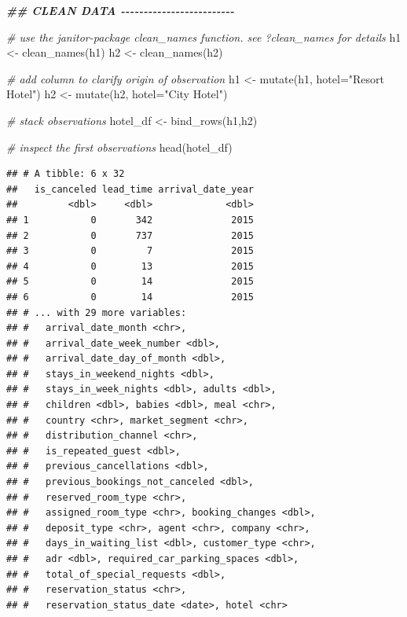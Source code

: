 \documentclass[
  12pt,
]{style/krantz}
\newenvironment{Shaded}{\begin{snugshade}}{\end{snugshade}}
\newcommand{\AttributeTok}[1]{\textcolor[rgb]{0.77,0.63,0.00}{#1}}
\newcommand{\CommentTok}[1]{\textcolor[rgb]{0.56,0.35,0.01}{\textit{#1}}}
\newcommand{\DocumentationTok}[1]{\textcolor[rgb]{0.56,0.35,0.01}{\textbf{\textit{#1}}}}
\newcommand{\FunctionTok}[1]{\textcolor[rgb]{0.00,0.00,0.00}{#1}}
\newcommand{\NormalTok}[1]{#1}
\newcommand{\OtherTok}[1]{\textcolor[rgb]{0.56,0.35,0.01}{#1}}
\newcommand{\StringTok}[1]{\textcolor[rgb]{0.31,0.60,0.02}{#1}}
\begin{document}
\begin{Shaded}
\begin{Highlighting}[]
\DocumentationTok{\#\# CLEAN DATA {-}{-}{-}{-}{-}{-}{-}{-}{-}{-}{-}{-}{-}{-}{-}{-}{-}{-}{-}{-}{-}{-}{-}{-}{-}}

\CommentTok{\# use the janitor{-}package clean\_names function. see ?clean\_names for details}
\NormalTok{h1 }\OtherTok{\textless{}{-}} \FunctionTok{clean\_names}\NormalTok{(h1)}
\NormalTok{h2 }\OtherTok{\textless{}{-}} \FunctionTok{clean\_names}\NormalTok{(h2)}

\CommentTok{\# add column to clarify origin of observation}
\NormalTok{h1 }\OtherTok{\textless{}{-}} \FunctionTok{mutate}\NormalTok{(h1, }\AttributeTok{hotel=}\StringTok{"Resort Hotel"}\NormalTok{)}
\NormalTok{h2 }\OtherTok{\textless{}{-}} \FunctionTok{mutate}\NormalTok{(h2, }\AttributeTok{hotel=}\StringTok{"City Hotel"}\NormalTok{)}

\CommentTok{\# stack observations}
\NormalTok{hotel\_df }\OtherTok{\textless{}{-}} \FunctionTok{bind\_rows}\NormalTok{(h1,h2)}

\CommentTok{\# inspect the first observations}
\FunctionTok{head}\NormalTok{(hotel\_df)}
\end{Highlighting}
\end{Shaded}

\begin{verbatim}
## # A tibble: 6 x 32
##   is_canceled lead_time arrival_date_year
##         <dbl>     <dbl>             <dbl>
## 1           0       342              2015
## 2           0       737              2015
## 3           0         7              2015
## 4           0        13              2015
## 5           0        14              2015
## 6           0        14              2015
## # ... with 29 more variables:
## #   arrival_date_month <chr>,
## #   arrival_date_week_number <dbl>,
## #   arrival_date_day_of_month <dbl>,
## #   stays_in_weekend_nights <dbl>,
## #   stays_in_week_nights <dbl>, adults <dbl>,
## #   children <dbl>, babies <dbl>, meal <chr>,
## #   country <chr>, market_segment <chr>,
## #   distribution_channel <chr>,
## #   is_repeated_guest <dbl>,
## #   previous_cancellations <dbl>,
## #   previous_bookings_not_canceled <dbl>,
## #   reserved_room_type <chr>,
## #   assigned_room_type <chr>, booking_changes <dbl>,
## #   deposit_type <chr>, agent <chr>, company <chr>,
## #   days_in_waiting_list <dbl>, customer_type <chr>,
## #   adr <dbl>, required_car_parking_spaces <dbl>,
## #   total_of_special_requests <dbl>,
## #   reservation_status <chr>,
## #   reservation_status_date <date>, hotel <chr>
\end{verbatim}
\end{document}
